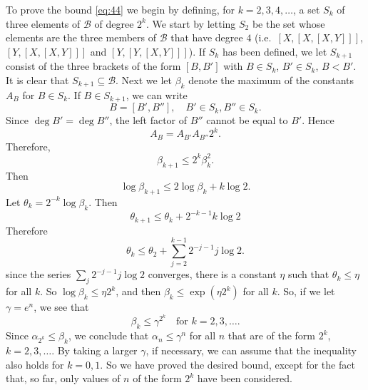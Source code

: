 \documentclass[leqno]{article}
\theoremstyle{plain}
\begin{document}
To prove the bound \eqref{eq:44} we begin by defining, for $k=2,3,4,\ldots$, a set $S_k$ of three elements of $\mathcal{B}$ of degree $2^k$.
We start by letting $S_2$ be the set whose elements are the three members of $\mathcal{B}$ that have degree $4$ (i.e.\ $[X,[X,[X,Y]]]$, $[Y,[X,[X,Y]]]$ and $[Y,[Y,[X,Y]]]$).
If $S_{k}$ has been defined, we let $S_{k+1}$ consist of the three brackets of the form $\left[B, B'\right]$ with $B \in S_k$, $B' \in S_k$, $B < B'$.
It is clear that $S_{k+1} \subseteq \mathcal{B}$. 
Next we let $\beta_{k}$ denote the maximum of the constants $A_B$ for $B \in S_{k}$.
If $B \in S_{k+1}$, we can write
\begin{equation}
	B = [B', B''], \quad B' \in S_k, B'' \in S_k.
\end{equation}
Since $\operatorname{deg} B' = \operatorname{deg} B''$, the left factor of $B''$ cannot be equal to $B'$.
Hence
\begin{equation}
	A_B = A_{B'} A_{B''} 2^k.
\end{equation}
Therefore,
\begin{equation}
	\beta_{k+1} \leq 2^{k} \beta_{k}^2.
\end{equation}
Then
\begin{equation}
	\log \beta_{k+1} \leq 2 \log \beta_{k}+k \log 2.
\end{equation}
Let $\theta_{k}=2^{-k} \log \beta_{k}$. 
Then
\begin{equation}
	\theta_{k+1} \leq \theta_{k}+2^{-k-1} k \log 2
\end{equation}
Therefore
\begin{equation}
	\theta_{k} \leq \theta_{2}+\sum_{j=2}^{k-1} 2^{-j-1} j \log 2.
\end{equation}
since the series $\sum_{j} 2^{-j-1} j \log 2$ converges, there is a constant $\eta$ such that $\theta_k \leq \eta$ for all $k$. 
So $\log \beta_{k} \leq \eta 2^{k}$, and then $\beta_{k} \leq \exp \left(\eta 2^{k}\right)$ for all $k$. 
So, if we let $\gamma=e^{n}$, we see that
\begin{equation}
	\beta_k \leq \gamma^{2^k} \quad \text{for } k = 2,3,\ldots.
\end{equation}
Since $\alpha_{2^k} \leq \beta_{k}$, we conclude that $\alpha_{n} \leq \gamma^{n}$ for all $n$ that are of the form $2^{k}$, $k=2,3,\ldots$. 
By taking a larger $\gamma$, if necessary, we can assume that the inequality also holds for $k=0,1$. 
So we have proved the desired bound, except for the fact that, so far, only values of $n$ of the form $2^{k}$ have been considered.
\end{document}
